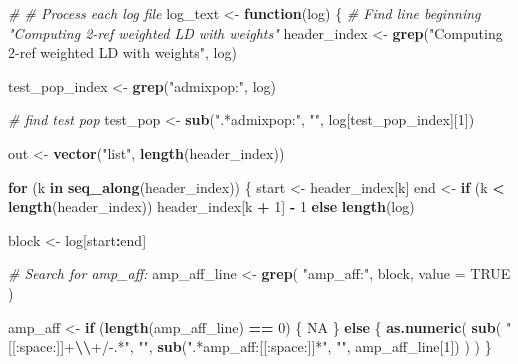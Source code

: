 \documentclass[
]{article}
\newenvironment{Shaded}{\begin{snugshade}}{\end{snugshade}}
\newcommand{\AttributeTok}[1]{\textcolor[rgb]{0.13,0.29,0.53}{#1}}
\newcommand{\CommentTok}[1]{\textcolor[rgb]{0.56,0.35,0.01}{\textit{#1}}}
\newcommand{\ConstantTok}[1]{\textcolor[rgb]{0.56,0.35,0.01}{#1}}
\newcommand{\ControlFlowTok}[1]{\textcolor[rgb]{0.13,0.29,0.53}{\textbf{#1}}}
\newcommand{\DecValTok}[1]{\textcolor[rgb]{0.00,0.00,0.81}{#1}}
\newcommand{\FunctionTok}[1]{\textcolor[rgb]{0.13,0.29,0.53}{\textbf{#1}}}
\newcommand{\NormalTok}[1]{#1}
\newcommand{\OtherTok}[1]{\textcolor[rgb]{0.56,0.35,0.01}{#1}}
\newcommand{\SpecialCharTok}[1]{\textcolor[rgb]{0.81,0.36,0.00}{\textbf{#1}}}
\newcommand{\StringTok}[1]{\textcolor[rgb]{0.31,0.60,0.02}{#1}}
\begin{document}
\begin{Shaded}
\begin{Highlighting}[]
\CommentTok{\# \# Process each log file}
\NormalTok{log\_text }\OtherTok{\textless{}{-}} \ControlFlowTok{function}\NormalTok{(log) \{}
  \CommentTok{\# Find line beginning "Computing 2{-}ref weighted LD with weights"}
\NormalTok{  header\_index }\OtherTok{\textless{}{-}} \FunctionTok{grep}\NormalTok{(}\StringTok{"Computing 2{-}ref weighted LD with weights"}\NormalTok{, log)}

\NormalTok{  test\_pop\_index }\OtherTok{\textless{}{-}} \FunctionTok{grep}\NormalTok{(}\StringTok{"admixpop:"}\NormalTok{, log)}

  \CommentTok{\# find test pop}
\NormalTok{  test\_pop }\OtherTok{\textless{}{-}} \FunctionTok{sub}\NormalTok{(}\StringTok{".*admixpop:"}\NormalTok{, }\StringTok{""}\NormalTok{, log[test\_pop\_index][}\DecValTok{1}\NormalTok{])}

\NormalTok{  out }\OtherTok{\textless{}{-}} \FunctionTok{vector}\NormalTok{(}\StringTok{"list"}\NormalTok{, }\FunctionTok{length}\NormalTok{(header\_index))}


  \ControlFlowTok{for}\NormalTok{ (k }\ControlFlowTok{in} \FunctionTok{seq\_along}\NormalTok{(header\_index)) \{}
\NormalTok{    start }\OtherTok{\textless{}{-}}\NormalTok{ header\_index[k]}
\NormalTok{    end }\OtherTok{\textless{}{-}} \ControlFlowTok{if}\NormalTok{ (k }\SpecialCharTok{\textless{}} \FunctionTok{length}\NormalTok{(header\_index)) header\_index[k }\SpecialCharTok{+} \DecValTok{1}\NormalTok{] }\SpecialCharTok{{-}} \DecValTok{1} \ControlFlowTok{else} \FunctionTok{length}\NormalTok{(log)}

\NormalTok{    block }\OtherTok{\textless{}{-}}\NormalTok{ log[start}\SpecialCharTok{:}\NormalTok{end]}

    \CommentTok{\# Search for \textquotesingle{}amp\_aff:\textquotesingle{}}
\NormalTok{    amp\_aff\_line }\OtherTok{\textless{}{-}} \FunctionTok{grep}\NormalTok{(}
      \StringTok{"amp\_aff:"}\NormalTok{,}
\NormalTok{      block,}
      \AttributeTok{value =} \ConstantTok{TRUE}
\NormalTok{    )}

\NormalTok{    amp\_aff }\OtherTok{\textless{}{-}} \ControlFlowTok{if}\NormalTok{ (}\FunctionTok{length}\NormalTok{(amp\_aff\_line) }\SpecialCharTok{==} \DecValTok{0}\NormalTok{) \{}
      \ConstantTok{NA}
\NormalTok{    \} }\ControlFlowTok{else}\NormalTok{ \{}
      \FunctionTok{as.numeric}\NormalTok{(}
        \FunctionTok{sub}\NormalTok{(}
          \StringTok{"[[:space:]]+}\SpecialCharTok{\textbackslash{}\textbackslash{}}\StringTok{+/{-}.*"}\NormalTok{, }\StringTok{""}\NormalTok{,}
          \FunctionTok{sub}\NormalTok{(}\StringTok{".*amp\_aff:[[:space:]]*"}\NormalTok{, }\StringTok{""}\NormalTok{, amp\_aff\_line[}\DecValTok{1}\NormalTok{])}
\NormalTok{        )}
\NormalTok{      )}
\NormalTok{    \}}


\end{Highlighting}
\end{Shaded}
\end{document}
